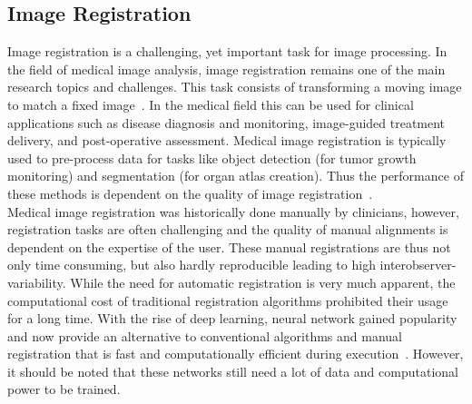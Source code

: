 \subsection{Image Registration} \label{SubSec:ImageRegistration}
Image registration is a challenging, yet important task for image processing. In the field of medical image analysis, image registration remains one of the main research topics and challenges. This task consists of transforming a moving image to match a fixed image~\cite{NiftiReg}. 
In the medical field this can be used for clinical applications such as disease diagnosis and monitoring, image-guided treatment delivery, and post-operative assessment. Medical image registration is typically used to pre-process data for tasks like object detection (for tumor growth monitoring) and segmentation (for organ atlas creation).
Thus the performance of these methods is dependent on the quality of image registration~\cite{Chen2020}. \\
Medical image registration was historically done manually by clinicians, however, registration tasks are often challenging and the quality of manual alignments is dependent on the expertise of the user. These manual registrations are thus not only time consuming, but also hardly reproducible leading to high interobserver-variability. While the need for automatic registration is very much apparent, the computational cost of traditional registration algorithms prohibited their usage for a long time. 
With the rise of deep learning, neural network gained popularity and now provide an alternative to conventional algorithms and manual registration that is fast and computationally efficient during execution~\cite{Haskins2020}. However, it should be noted that these networks still need a lot of data and computational power to be trained.\\
